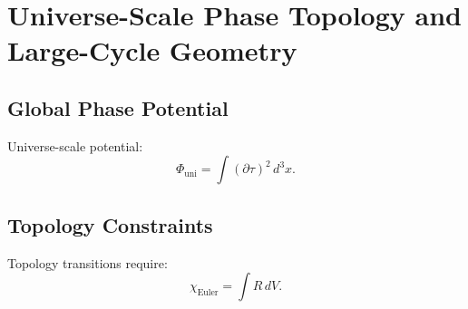 \chapter{Universe-Scale Phase Topology and Large-Cycle Geometry}

\section{Global Phase Potential}
Universe-scale potential:
\[
\Phi_{\mathrm{uni}} = \int (\partial\tau)^2\, d^3x.
\]

\section{Topology Constraints}
Topology transitions require:
\[
\chi_{\mathrm{Euler}} = \int R\, dV.
\]

